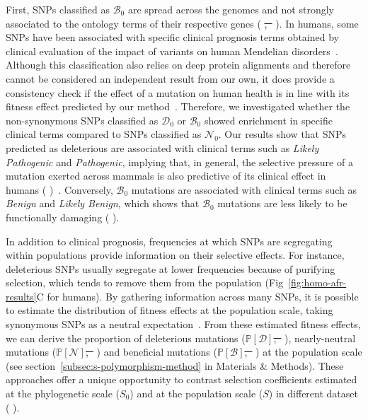\documentclass[10pt,letterpaper]{article}
\newcommand{\proba}{\mathbb{P}}
\newcommand{\Sphy}{S_{0}}
\newcommand{\SphyDel}{\mathcal{D}_0}
\newcommand{\SphyNeu}{\mathcal{N}_0}
\newcommand{\SphyBen}{\mathcal{B}_0}
\newcommand{\Spop}{S}
\newcommand{\SpopDel}{\mathcal{D}}
\newcommand{\SpopNeu}{\mathcal{N}}
\newcommand{\SpopBen}{\mathcal{B}}
\newcommand{\ProbaPopDel}{\proba [ \SpopDel]}
\newcommand{\ProbaPopNeu}{\proba [ \SpopNeu ]}
\newcommand{\ProbaPopBen}{\proba [ \SpopBen ]}
\providecommand{\DIFaddtex}[1]{{\protect\color{blue}\uwave{#1}}} %
\providecommand{\DIFdeltex}[1]{{\protect\color{red}\sout{#1}}}                      %
\providecommand{\DIFaddbegin}{} %
\providecommand{\DIFaddend}{} %
\providecommand{\DIFdelbegin}{} %
\providecommand{\DIFdelend}{} %
\providecommand{\DIFadd}[1]{\texorpdfstring{\DIFaddtex{#1}}{#1}} %
\providecommand{\DIFdel}[1]{\texorpdfstring{\DIFdeltex{#1}}{}} %
\newcommand{\DIFscaledelfig}{0.5}
\newlength{\DIFdelgraphicswidth} %
\newlength{\DIFdelgraphicsheight} %
\newcommand{\DIFaddincludegraphics}[2][]{{\color{blue}\fbox{\DIFOincludegraphics[#1]{#2}}}} %
\newcommand{\DIFdelincludegraphics}[2][]{%
\sbox{\DIFdelgraphicsbox}{\DIFOincludegraphics[#1]{#2}}%
\settoboxwidth{\DIFdelgraphicswidth}{\DIFdelgraphicsbox} %
\settoboxtotalheight{\DIFdelgraphicsheight}{\DIFdelgraphicsbox} %
\scalebox{\DIFscaledelfig}{%
\parbox[b]{\DIFdelgraphicswidth}{\usebox{\DIFdelgraphicsbox}\\[-\baselineskip] \rule{\DIFdelgraphicswidth}{0em}}\llap{\resizebox{\DIFdelgraphicswidth}{\DIFdelgraphicsheight}{%
\setlength{\unitlength}{\DIFdelgraphicswidth}%
\begin{picture}(1,1)%
\thicklines\linethickness{2pt} %
{\color[rgb]{1,0,0}\put(0,0){\framebox(1,1){}}}%
{\color[rgb]{1,0,0}\put(0,0){\line( 1,1){1}}}%
{\color[rgb]{1,0,0}\put(0,1){\line(1,-1){1}}}%
\end{picture}%
}\hspace*{3pt}}} %
} %
\DeclareRobustCommand{\DIFaddbegin}{\DIFOaddbegin \let\includegraphics\DIFaddincludegraphics} %
\DeclareRobustCommand{\DIFaddend}{\DIFOaddend \let\includegraphics\DIFOincludegraphics} %
\DeclareRobustCommand{\DIFdelbegin}{\DIFOdelbegin \let\includegraphics\DIFdelincludegraphics} %
\DeclareRobustCommand{\DIFdelend}{\DIFOaddend \let\includegraphics\DIFOincludegraphics} %
\begin{document}
First, SNPs classified as $\SphyBen$ are spread across the genomes and not strongly associated to the ontology terms of their respective genes (\DIFdelbegin %
\DIFdel{,~}%
\DIFdelend \DIFaddbegin \DIFadd{Table~D and Fig~C in~}\DIFaddend ).
In humans, some SNPs have been associated with specific clinical prognosis terms obtained by clinical evaluation of the impact of variants on human Mendelian disorders~\cite{landrum_clinvar_2018}.
Although this classification also relies on deep protein alignments and therefore cannot be considered an independent result from our own, it does provide a consistency check if the effect of a mutation on human health is in line with its fitness effect predicted by our method~\cite{grimm_evaluation_2015}.
Therefore, we investigated whether the non-synonymous SNPs classified as $\SphyDel$ or $\SphyBen$ showed enrichment in specific clinical terms compared to SNPs classified as $\SphyNeu$.
Our results show that SNPs predicted as deleterious are associated with clinical terms such as \textit{Likely Pathogenic} and \textit{Pathogenic}, implying that, in general, the selective pressure of a mutation exerted across mammals is also predictive of its clinical effect in humans (\DIFdelbegin %
\DIFdelend \DIFaddbegin \DIFadd{Table~E in~}\DIFaddend )~\cite{sullivan_leveraging_2023}.
Conversely, $\SphyBen$ mutations are associated with clinical terms such as \textit{Benign} and \textit{Likely Benign}, which shows that $\SphyBen$ mutations are less likely to be functionally damaging (\DIFdelbegin %
\DIFdelend \DIFaddbegin \DIFadd{Table~F in~}\DIFaddend ).

In addition to clinical prognosis, frequencies at which SNPs are segregating within populations provide information on their selective effects.
For instance, deleterious SNPs usually segregate at lower frequencies because of purifying selection, which tends to remove them from the population (Fig~\ref{fig:homo-afr-results}C for humans).
By gathering information across many SNPs, it is possible to estimate the distribution of fitness effects at the population scale, taking synonymous SNPs as a neutral expectation~\cite{eyre-walker_distribution_2006, eyre-walker_estimating_2009, galtier_adaptive_2016, tataru_inference_2017}.
From these estimated fitness effects, we can derive the proportion of deleterious mutations ($\ProbaPopDel$\DIFdelbegin \DIFdel{,~}%
\DIFdelend ), nearly-neutral mutations ($\ProbaPopNeu$\DIFdelbegin \DIFdel{,~}%
\DIFdelend ) and beneficial mutations ($\ProbaPopBen$\DIFdelbegin \DIFdel{,~}%
\DIFdelend ) at the population scale (see section~\ref{subsec:s-polymorphism-method} in Materials \& Methods\DIFaddbegin \DIFadd{, Fig~A-C in~}\DIFaddend ).
These approaches offer a unique opportunity to contrast selection coefficients estimated at the phylogenetic scale ($\Sphy$) and at the population scale ($\Spop$) in different dataset (\DIFdelbegin %
\DIFdelend \DIFaddbegin \DIFadd{Fig~D in~}\DIFaddend ).
\end{document}
